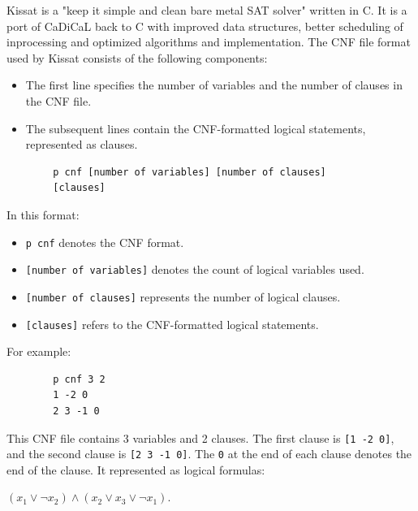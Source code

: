 Kissat\cite{kissat_jku} is a "keep it simple and clean bare metal SAT solver" written in C.
It is a port of CaDiCaL back to C with improved data structures, better scheduling of inprocessing and optimized algorithms and implementation.
The CNF file format used by Kissat consists of the following components:

\begin{itemize}
    \item The first line specifies the number of variables and the number of clauses in the CNF file.
    \item The subsequent lines contain the CNF-formatted logical statements, represented as clauses.
\end{itemize}

\begin{center}
    \begin{verbatim}
        p cnf [number of variables] [number of clauses]
        [clauses]
    \end{verbatim}
\end{center}

\begin{flushleft}
    In this format:
\end{flushleft}
\begin{itemize}
    \item \texttt{p cnf} denotes the CNF format.
    \item \texttt{[number of variables]} denotes the count of logical variables used.
    \item \texttt{[number of clauses]} represents the number of logical clauses.
    \item \texttt{[clauses]} refers to the CNF-formatted logical statements.
\end{itemize}

For example:
\begin{center}
    \begin{verbatim}
        p cnf 3 2
        1 -2 0
        2 3 -1 0
    \end{verbatim}
\end{center}

This CNF file contains 3 variables and 2 clauses.
The first clause is \texttt{[1 -2 0]}, and the second clause is \texttt{[2 3 -1 0]}.
The \texttt{0} at the end of each clause denotes the end of the clause.
It represented as logical formulas:
\begin{center}
    $(x_1 \vee \neg x_2) \wedge (x_2 \vee x_3 \vee \neg x_1)$.
\end{center}

